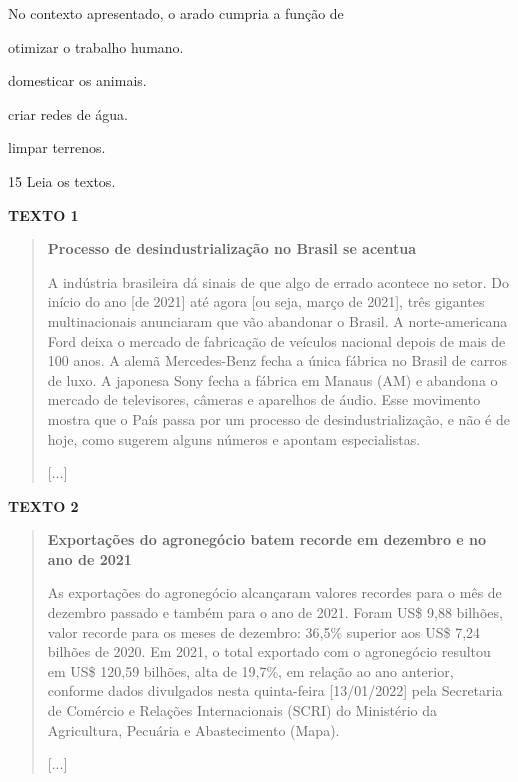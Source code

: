 No contexto apresentado, o arado cumpria a função de

\begin{escolha}
\item
  otimizar o trabalho humano.
\item
  domesticar os animais.
\item
  criar redes de água.
\item
  limpar terrenos.
\end{escolha}

\num{15} Leia os textos.

\textbf{TEXTO 1}

\begin{quote}
\textbf{Processo de desindustrialização no Brasil se acentua}

A indústria brasileira dá sinais de que algo de errado acontece no
setor. Do início do ano [de 2021] até agora [ou seja, março de 2021], três gigantes multinacionais
anunciaram que vão abandonar o Brasil. A norte-americana Ford deixa o
mercado de fabricação de veículos nacional depois de mais de 100 anos. A
alemã Mercedes-Benz fecha a única fábrica no Brasil de carros de luxo. A
japonesa Sony fecha a fábrica em Manaus (AM) e abandona o mercado de
televisores, câmeras e aparelhos de áudio. Esse movimento mostra que o
País passa por um processo de desindustrialização, e não é de hoje, como
sugerem alguns números e apontam especialistas.

{[}...{]}

\end{quote}

\textbf{TEXTO 2}

\begin{quote}
\textbf{Exportações do agronegócio batem recorde em dezembro e no ano de 2021}

As exportações do agronegócio alcançaram valores recordes para o
mês de dezembro passado e também para o ano de 2021. Foram US\$ 9,88
bilhões, valor recorde para os meses de dezembro: 36,5\% superior aos
US\$ 7,24 bilhões de 2020. Em 2021, o total exportado com o agronegócio
resultou em US\$ 120,59 bilhões, alta de 19,7\%, em relação ao ano
anterior, conforme dados divulgados nesta quinta-feira [13/01/2022] pela
Secretaria de Comércio e Relações Internacionais (SCRI) do Ministério da
Agricultura, Pecuária e Abastecimento (Mapa).

{[}...{]}

\end{quote}

